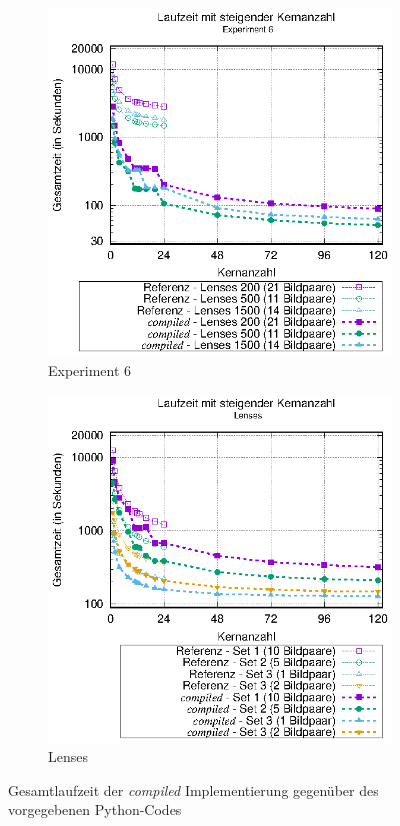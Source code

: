 \begin{center}
	\begin{figure}[h]
		\begin{subfigure}[b]{0.45\textwidth}
			\centering
			\includegraphics[width=\textwidth]{pdf/best_times_exp6}
			\caption{Experiment 6}
			\label{fig:best_times_exp6}
		\end{subfigure}
		\hfill
		\begin{subfigure}[b]{0.45\textwidth}
			\centering
			\includegraphics[width=\textwidth]{pdf/best_times_lenses}
			\caption{Lenses}
			\label{fig:best_times_lenses}
		\end{subfigure}
		\caption{Gesamtlaufzeit der \textit{compiled} Implementierung gegenüber des vorgegebenen Python-Codes}
		\label{fig:best_times}
	\end{figure}
\end{center}


